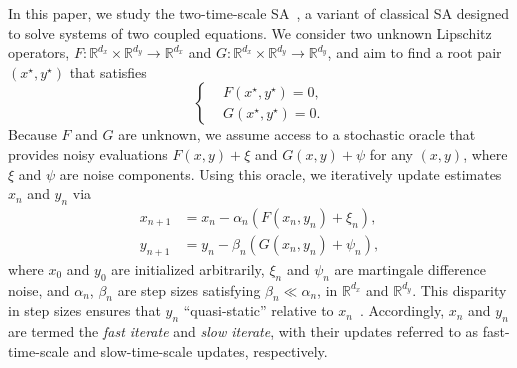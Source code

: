 \documentclass[11pt]{article}
\theoremstyle{plain}
\theoremstyle{definition}
\def\RB{{\mathbb R}}
\begin{document}
In this paper, we study the two-time-scale SA~\citep{borkar1997stochastic}, a variant of classical SA designed to solve systems of two coupled equations. We consider two unknown Lipschitz operators,
$F:\RB^{d_x}\times\RB^{d_y}\rightarrow\RB^{d_x}$ and $G:\RB^{d_x}\times\RB^{d_y}\rightarrow\RB^{d_y}$, and aim to find a root pair $(x^{\star}, y^{\star})$ that satisfies
\begin{equation}
	\left\{
	\begin{aligned}
		&F(x^{\star},y^{\star}) = 0,\\
		&G(x^{\star},y^{\star}) = 0.
	\end{aligned}\right.\label{prob:FG}
\end{equation}
Because $F$ and $G$ are unknown, we assume access to a stochastic oracle that provides noisy evaluations $F(x,y)+ \xi$ and $G(x,y) + \psi$ for any $(x,y)$, where $\xi$ and $\psi$ are noise components.
Using this oracle, we iteratively update estimates $x_{n}$ and $y_{n}$ via
\begin{subequations} \label{alg:xy}
	\begin{align}
		x_{n+1} &= x_{n} - \alpha_{n}\left(F(x_{n},y_{n}) + \xi_{n}\right), \label{alg:x} \\   
		y_{n+1} &= y_{n} - \beta_{n}\left(G(x_{n},y_{n}) + \psi_{n}\right), \label{alg:y}
	\end{align}
\end{subequations}
where $x_{0}$ and $y_{0}$ are initialized arbitrarily, $\xi_n$ and $\psi_n$ are martingale difference noise, and $\alpha_{n}$, $\beta_{n}$ are step sizes satisfying $\beta_{n}\ll \alpha_{n}$,
in $\RB^{d_x}$ and $\RB^{d_y}$.
This disparity in step sizes ensures that $y_n$ ``quasi-static'' relative to $x_n$~\citep{konda2004convergence}.
Accordingly, $x_n$ and $y_n$ are termed the \textit{fast iterate} and \textit{slow iterate}, with their updates referred to as fast-time-scale and slow-time-scale updates, respectively.
\end{document}
